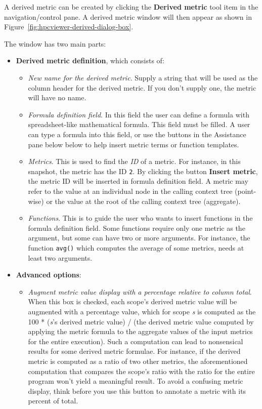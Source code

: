 A derived metric can be created by clicking the \textbf{Derived metric} tool item in the navigation/control pane.
A derived metric window will then appear as shown in Figure~\ref{fig:hpcviewer-derived-dialog-box}.


The window has two main parts:
\begin{itemize}

\item \textbf{Derived metric definition}, which consists of:

\begin{itemize}

\item \textit{New name for the derived metric}.
  Supply a string that will be used as the column header for the derived metric.
  If you don't supply one, the metric will have no name.

\item \textit{Formula definition field}.
  In this field the user can define a formula with spreadsheet-like mathematical formula.
  This field must be filled. A user can type a formula into this field, or use the buttons in the Assistance pane below below to help insert metric terms or function templates.

\item \textit{Metrics}.
  This is used to find the \textit{ID} of a metric.
  For instance, in this snapshot, the metric  has the ID \texttt{2}.
  By clicking the button \textbf{Insert metric}, the metric ID will be inserted in formula definition field. A metric may refer to the value at an individual node in the calling context tree (point-wise) or the value at the root of the calling context tree (aggregate).

\item \textit{Functions}.
  This is to guide the user who wants to insert functions in the formula definition field.
  Some functions require only one metric as the argument, but some can have two or more arguments.
  For instance, the function \texttt{avg()} which computes the average of some metrics, needs at least two arguments.
\end{itemize}

\item \textbf{Advanced options}:
\begin{itemize}

\item \textit{Augment metric value display with a percentage relative to column total}.
  When this box is checked, each scope's derived metric value will be augmented with a percentage value, which for scope \textit{s} is computed as the 100 * (\textit{s}'s derived metric value) / (the derived metric value computed by applying the metric formula to the aggregate values of the input metrics for the entire execution).
  Such a computation can lead to nonsensical results for some derived metric formulae.
  For instance, if the derived metric is computed as a ratio of two other metrics, the aforementioned computation that compares the scope's ratio with the ratio for the entire program won't yield a meaningful result.
  To avoid a confusing metric display, think before you use this button to annotate a metric with its percent of total.


\end{itemize}
\end{itemize}
